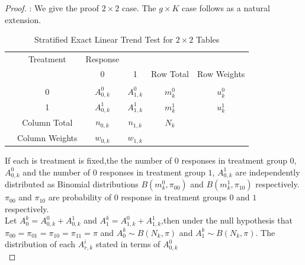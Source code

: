 \documentclass[12pt,oneside]{report}
\theoremstyle{definition}
\theoremstyle{mystyle}
\begin{document}
\begin{proof}:
	We give the proof $2\times 2$ case. The $g\times K$ case  follows as a natural extension. 
	\begin{table}[h!]
		\begin{center}
			\caption{Stratified  Exact Linear Trend  Test for $2 \times 2$ Tables}
			\begin{tabular}{|c c|c| c| c|c| }
				\hline
				&Treatment &Response   &  &  &\\ 
				
				& & 0& 1 &Row Total&Row Weights \\ \hline
				
				\hline
				&&&&&\\
				
				&0&$ A_{0,k}^{0}$& $A_{1,k}^{0}$ &$m_{k}^{0}$&$u_{k}^{0}$ \\\hline
				&1&$ A_{0,k}^{1}$& $A_{1,k}^{1}$ &$m_{k}^{1}$&$u_{k}^{1}$ \\ \hline
				
				&Column Total & $n_{0,k}$ & $n_{1,k}$ & $N_{k}$& \\\hline
				&Column Weights & $w_{0,k}$ & $w_{1,k}$ & & \\\hline
				
				
			\end{tabular}
			\label{table:1}
		\end{center}
	\end{table}
	
	If each is treatment is  fixed,the the number of $0$  responses in treatment group $0$, $A_{0,k}^{0}$ and the number of $0$  responses in treatment group $1$, $A_{0,k}^{1}$
	are independently distributed as Binomial distributions $B(m_{k}^{0},\pi_{00})$ and $B(m_{k}^{1},\pi_{10})$ respectively.\\
	 $\pi_{00}$ and $\pi_{10}$  are probability of $0$ response in treatment groups $0$ and $1$ respectively.\\
	Let $A^{k}_{0}= A_{0,k}^{0}+A_{0,k}^{1}$ and $A^{k}_{1}= A_{1,k}^{0}+A_{1,k}^{1}$,then under the null hypothesis that $\pi_{00}=\pi_{01}=\pi_{10}=\pi_{11}=\pi$
and   $A^{k}_{0} \sim B(N_{k},\pi)$ and  $A^{k}_{1} \sim B(N_{k},\pi)$.
	The distribution of each $A_{r,k}^{i}$ stated in terms of $A_{0,k}^{0}$\\
	

\end{proof}
\end{document}
